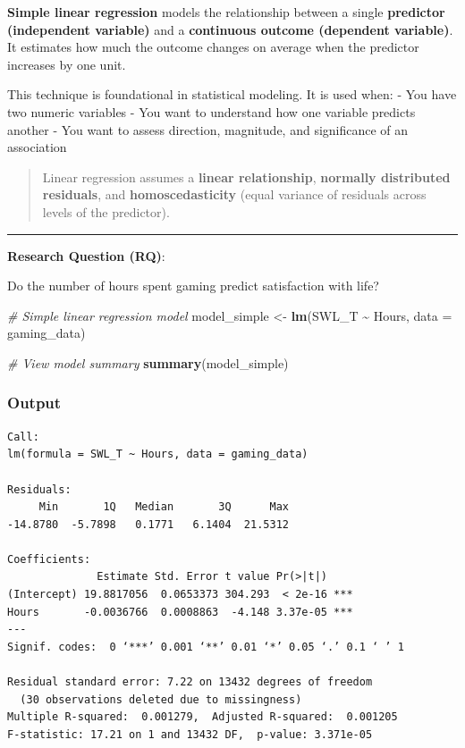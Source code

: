 \documentclass[
]{book}
\newenvironment{Shaded}{\begin{snugshade}}{\end{snugshade}}
\newcommand{\AttributeTok}[1]{\textcolor[rgb]{0.13,0.29,0.53}{#1}}
\newcommand{\CommentTok}[1]{\textcolor[rgb]{0.56,0.35,0.01}{\textit{#1}}}
\newcommand{\FunctionTok}[1]{\textcolor[rgb]{0.13,0.29,0.53}{\textbf{#1}}}
\newcommand{\NormalTok}[1]{#1}
\newcommand{\OtherTok}[1]{\textcolor[rgb]{0.56,0.35,0.01}{#1}}
\newcommand{\SpecialCharTok}[1]{\textcolor[rgb]{0.81,0.36,0.00}{\textbf{#1}}}
\begin{document}
\textbf{Simple linear regression} models the relationship between a single \textbf{predictor (independent variable)} and a \textbf{continuous outcome (dependent variable)}. It estimates how much the outcome changes on average when the predictor increases by one unit.

This technique is foundational in statistical modeling. It is used when:
- You have two numeric variables
- You want to understand how one variable predicts another
- You want to assess direction, magnitude, and significance of an association

\begin{quote}
Linear regression assumes a \textbf{linear relationship}, \textbf{normally distributed residuals}, and \textbf{homoscedasticity} (equal variance of residuals across levels of the predictor).
\end{quote}

\begin{center}\rule{0.5\linewidth}{0.5pt}\end{center}

\textbf{Research Question (RQ)}:

Do the number of hours spent gaming predict satisfaction with life?

\begin{Shaded}
\begin{Highlighting}[]
\CommentTok{\# Simple linear regression model}
\NormalTok{model\_simple }\OtherTok{\textless{}{-}} \FunctionTok{lm}\NormalTok{(SWL\_T }\SpecialCharTok{\textasciitilde{}}\NormalTok{ Hours, }\AttributeTok{data =}\NormalTok{ gaming\_data)}

\CommentTok{\# View model summary}
\FunctionTok{summary}\NormalTok{(model\_simple)}
\end{Highlighting}
\end{Shaded}

\subsubsection{Output}\label{output-6}

\begin{verbatim}
Call:
lm(formula = SWL_T ~ Hours, data = gaming_data)

Residuals:
     Min       1Q   Median       3Q      Max 
-14.8780  -5.7898   0.1771   6.1404  21.5312 

Coefficients:
              Estimate Std. Error t value Pr(>|t|)    
(Intercept) 19.8817056  0.0653373 304.293  < 2e-16 ***
Hours       -0.0036766  0.0008863  -4.148 3.37e-05 ***
---
Signif. codes:  0 ‘***’ 0.001 ‘**’ 0.01 ‘*’ 0.05 ‘.’ 0.1 ‘ ’ 1

Residual standard error: 7.22 on 13432 degrees of freedom
  (30 observations deleted due to missingness)
Multiple R-squared:  0.001279,  Adjusted R-squared:  0.001205 
F-statistic: 17.21 on 1 and 13432 DF,  p-value: 3.371e-05
\end{verbatim}
\end{document}
